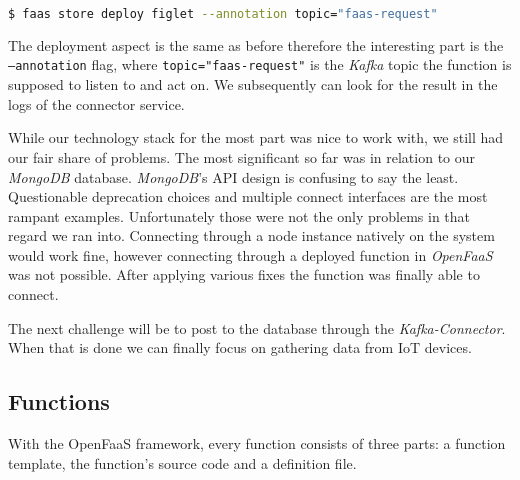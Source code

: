 \begin{lstlisting}[language=bash]
$ faas store deploy figlet --annotation topic="faas-request"
\end{lstlisting}

The deployment aspect is the same as before therefore the interesting part is the
\texttt{--annotation} flag, where \texttt{topic="faas-request"} is the \textit{Kafka} topic the
function is supposed to listen to and act on. We subsequently can look for the result in the logs of
the connector service.

While our technology stack for the most part was nice to work with, we still had our fair share of
problems. The most significant so far was in relation to our \textit{MongoDB} database.
\textit{MongoDB}'s API design is confusing to say the least. Questionable deprecation choices and
multiple connect interfaces are the most rampant examples. Unfortunately those were not the only
problems in that regard we ran into. Connecting through a node instance natively on the system would
work fine, however connecting through a deployed function in \textit{OpenFaaS} was not possible.
After applying various fixes the function was finally able to connect.

The next challenge will be to post to the database through the \textit{Kafka-Connector}. When that
is done we can finally focus on gathering data from IoT devices.

\subsection{Functions}

With the OpenFaaS framework, every function consists of three parts: a function template, the
function's source code and a definition file.

